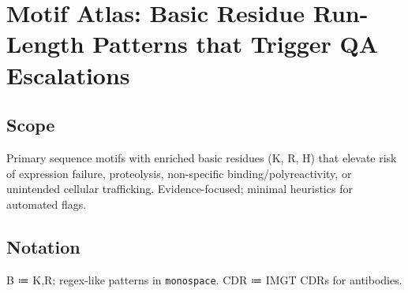 \section*{Motif Atlas: Basic Residue Run-Length Patterns that Trigger QA Escalations}

\subsection*{Scope}
Primary sequence motifs with enriched basic residues (K, R, H) that elevate risk of expression failure, proteolysis, non-specific binding/polyreactivity, or unintended cellular trafficking. Evidence-focused; minimal heuristics for automated flags.

\subsection*{Notation}
B ≔ {K,R}; regex-like patterns in \texttt{monospace}. CDR ≔ IMGT CDRs for antibodies.

